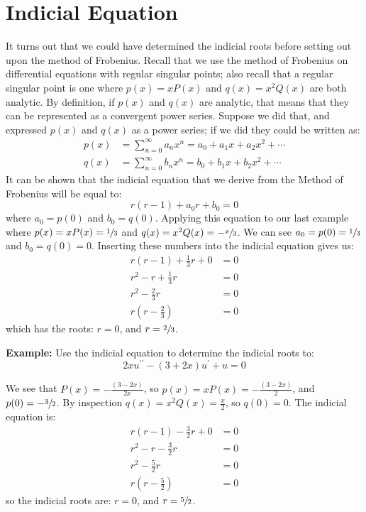\section{Indicial Equation} 
It turns out that we could have determined the indicial roots before setting out upon the method of Frobenius.  Recall that we use the method of Frobenius on differential equations with regular singular points; also recall that a regular singular point is one where $p(x)=xP(x)$ and $q(x)=x^2Q(x)$ are both analytic.  By definition, if $p(x)$ and $q(x)$ are analytic, that means that they can be represented as a convergent power series.  Suppose we did that, and expressed $p(x)$ and $q(x)$ as a power series; if we did they could be written as:
\begin{align*}
p(x) &= \sum\limits_{n=0}^{\infty} a_nx^n = a_0 + a_1x + a_2x^2 + \cdots \\
q(x) &= \sum\limits_{n=0}^{\infty} b_nx^n = b_0 + b_1x + b_2x^2 + \cdots
\end{align*}
It can be shown that the indicial equation that we derive from the Method of Frobenius will be equal to:
\begin{equation*}
r(r-1)+a_0r + b_0 = 0
\end{equation*}
where $a_0 = p(0)$ and $b_0 = q(0)$.  Applying this equation to our last example where $p(x)=xP(x) = \sfrac{1}{3}$ and $q(x) = x^2 Q(x) = -\sfrac{x}{3}$.  We can see $a_0 = p(0) = \sfrac{1}{3}$ and $b_0 = q(0) = 0$.  Inserting these numbers into the indicial equation gives us:
\begin{align*}
r(r-1)+\frac{1}{3}r + 0 &= 0 \\
r^2-r + \frac{1}{3}r &= 0 \\
r^2 - \frac{2}{3}r &= 0 \\
r(r-\frac{2}{3}) &=0
\end{align*}
which has the roots: $r = 0$, and $r = \sfrac{2}{3}$.

\vspace{0.5cm}

\noindent\textbf{Example:}  Use the indicial equation to determine the indicial roots to:
\begin{equation*}
2xu^{\prime \prime} - (3+2x)u^{\prime} + u = 0
\end{equation*}

\vspace{0.25cm}

\noindent We see that $P(x) = -\frac{(3 - 2x)}{2x}$, so $p(x) = xP(x) = -\frac{(3-2x)}{2}$, and $p(0) = -\sfrac{3}{2}$.  By inspection $q(x) = x^2Q(x) = \frac{x}{2}$, so $q(0) = 0$.  The indicial equation is:
\begin{align*}
r(r-1)-\frac{3}{2}r + 0 &= 0 \\
r^2-r - \frac{3}{2}r &= 0 \\
r^2 - \frac{5}{2}r &= 0 \\
r\left(r-\frac{5}{2}\right) &= 0
\end{align*}
so the indicial roots are: $r = 0$, and $r = \sfrac{5}{2}$.


